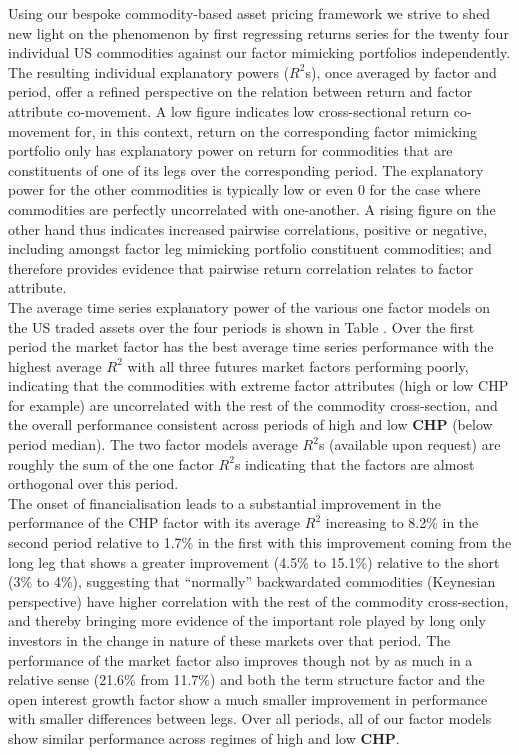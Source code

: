 \documentclass[
  authoryear,
  preprint,
  3p]{elsarticle}
\begin{document}
Using our bespoke commodity-based asset pricing framework we strive to
shed new light on the phenomenon by first regressing returns series for
the twenty four individual US commodities against our factor mimicking
portfolios independently. The resulting individual explanatory powers
(\(R^2\)s), once averaged by factor and period, offer a refined
perspective on the relation between return and factor attribute
co-movement. A low figure indicates low cross-sectional return
co-movement for, in this context, return on the corresponding factor
mimicking portfolio only has explanatory power on return for commodities
that are constituents of one of its legs over the corresponding period.
The explanatory power for the other commodities is typically low or even
0 for the case where commodities are perfectly uncorrelated with
one-another. A rising figure on the other hand thus indicates increased
pairwise correlations, positive or negative, including amongst factor
leg mimicking portfolio constituent commodities; and therefore provides
evidence that pairwise return correlation relates to factor attribute.\\
The average time series explanatory power of the various one factor
models on the US traded assets over the four periods is shown in Table .
Over the first period the market factor has the best average time series
performance with the highest average \(R^{2}\) with all three futures
market factors performing poorly, indicating that the commodities with
extreme factor attributes (high or low CHP for example) are uncorrelated
with the rest of the commodity cross-section, and the overall
performance consistent across periods of high and low \textbf{CHP}
(below period median). The two factor models average \(R^{2}\)s
(available upon request) are roughly the sum of the one factor
\(R^{2}\)s indicating that the factors are almost orthogonal over this
period.\\
The onset of financialisation leads to a substantial improvement in the
performance of the CHP factor with its average \(R^{2}\) increasing to
8.2\% in the second period relative to 1.7\% in the first with this
improvement coming from the long leg that shows a greater improvement
(4.5\% to 15.1\%) relative to the short (3\% to 4\%), suggesting that
``normally'' backwardated commodities (Keynesian perspective) have
higher correlation with the rest of the commodity cross-section, and
thereby bringing more evidence of the important role played by long only
investors in the change in nature of these markets over that period. The
performance of the market factor also improves though not by as much in
a relative sense (21.6\% from 11.7\%) and both the term structure factor
and the open interest growth factor show a much smaller improvement in
performance with smaller differences between legs. Over all periods, all
of our factor models show similar performance across regimes of high and
low \textbf{CHP}.
\end{document}
